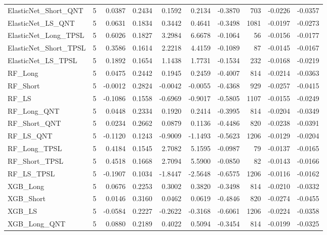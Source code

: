 \begin{tabular}{llrrrrrrrr}
\cline{1-10}
ElasticNet\_Short\_QNT & 5 & 0.0387 & 0.2434 & 0.1592 & 0.2134 & -0.3870 & 703 & -0.0226 & -0.0357 \\
\cline{1-10}
ElasticNet\_LS\_QNT & 5 & 0.0631 & 0.1834 & 0.3442 & 0.4641 & -0.3498 & 1081 & -0.0197 & -0.0273 \\
\cline{1-10}
ElasticNet\_Long\_TPSL & 5 & 0.6026 & 0.1827 & 3.2984 & 6.6678 & -0.1064 & 56 & -0.0156 & -0.0177 \\
\cline{1-10}
ElasticNet\_Short\_TPSL & 5 & 0.3586 & 0.1614 & 2.2218 & 4.4159 & -0.1089 & 87 & -0.0145 & -0.0167 \\
\cline{1-10}
ElasticNet\_LS\_TPSL & 5 & 0.1892 & 0.1654 & 1.1438 & 1.7731 & -0.1534 & 232 & -0.0168 & -0.0219 \\
\cline{1-10}
RF\_Long & 5 & 0.0475 & 0.2442 & 0.1945 & 0.2459 & -0.4007 & 814 & -0.0214 & -0.0363 \\
\cline{1-10}
RF\_Short & 5 & -0.0012 & 0.2824 & -0.0042 & -0.0055 & -0.4368 & 929 & -0.0257 & -0.0415 \\
\cline{1-10}
RF\_LS & 5 & -0.1086 & 0.1558 & -0.6969 & -0.9017 & -0.5805 & 1107 & -0.0155 & -0.0249 \\
\cline{1-10}
RF\_Long\_QNT & 5 & 0.0448 & 0.2334 & 0.1920 & 0.2414 & -0.3995 & 814 & -0.0204 & -0.0349 \\
\cline{1-10}
RF\_Short\_QNT & 5 & 0.0234 & 0.2662 & 0.0879 & 0.1136 & -0.4486 & 820 & -0.0238 & -0.0391 \\
\cline{1-10}
RF\_LS\_QNT & 5 & -0.1120 & 0.1243 & -0.9009 & -1.1493 & -0.5623 & 1206 & -0.0129 & -0.0204 \\
\cline{1-10}
RF\_Long\_TPSL & 5 & 0.4184 & 0.1545 & 2.7082 & 5.1595 & -0.0987 & 79 & -0.0137 & -0.0165 \\
\cline{1-10}
RF\_Short\_TPSL & 5 & 0.4518 & 0.1668 & 2.7094 & 5.5900 & -0.0850 & 82 & -0.0143 & -0.0166 \\
\cline{1-10}
RF\_LS\_TPSL & 5 & -0.1907 & 0.1034 & -1.8447 & -2.5648 & -0.6575 & 1206 & -0.0116 & -0.0162 \\
\cline{1-10}
XGB\_Long & 5 & 0.0676 & 0.2253 & 0.3002 & 0.3820 & -0.3498 & 814 & -0.0210 & -0.0332 \\
\cline{1-10}
XGB\_Short & 5 & 0.0146 & 0.3160 & 0.0462 & 0.0619 & -0.4846 & 820 & -0.0274 & -0.0455 \\
\cline{1-10}
XGB\_LS & 5 & -0.0584 & 0.2227 & -0.2622 & -0.3168 & -0.6061 & 1206 & -0.0224 & -0.0358 \\
\cline{1-10}
XGB\_Long\_QNT & 5 & 0.0880 & 0.2189 & 0.4022 & 0.5094 & -0.3454 & 814 & -0.0199 & -0.0325 \\

\end{tabular}
